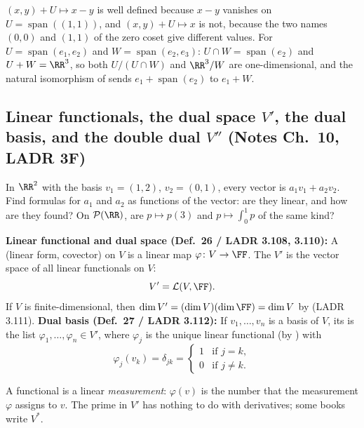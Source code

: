 \documentclass[10pt]{scrartcl}
\DeclareMathOperator{\spn}{span}\DeclareMathOperator{\nul}{null}\DeclareMathOperator{\range}{range}
\newcommand{\PP}{\mathcal P}\newcommand{\LL}{\mathcal L}\newcommand{\MM}{\mathcal M}\newcommand{\T}{\mathsf T}
\begin{document}
\revisit $(x,y)+U\mapsto x-y$ is well defined because $x-y$ vanishes on $U=\spn((1,1))$, and $(x,y)+U\mapsto x$ is not, because the two names $(0,0)$ and $(1,1)$ of the zero coset give different values. For $U=\spn(e_1,e_2)$ and $W=\spn(e_2,e_3)$: $U\cap W=\spn(e_2)$ and $U+W=\RR^3$, so both $U/(U\cap W)$ and $\RR^3/W$ are one-dimensional, and the natural isomorphism of  sends $e_1+\spn(e_2)$ to $e_1+W$.

\subsection{Linear functionals, the dual space $V'$, the dual basis, and the double dual $V''$ (Notes Ch.~10, LADR 3F)}

\begin{qbox}
  In $\RR^2$ with the basis $v_1=(1,2)$, $v_2=(0,1)$, every vector is $a_1v_1+a_2v_2$. Find formulas for $a_1$ and $a_2$ as functions of the vector: are they linear, and how are they found? On $\PP(\RR)$, are $p\mapsto p(3)$ and $p\mapsto\int_0^1p$ of the same kind?
\end{qbox}

\begin{definition*}
  \begin{itemize}
    \ii \textbf{Linear functional and dual space (Def.~26 / LADR 3.108, 3.110):} A  (linear form, covector) on $V$ is a linear map $\varphi\colon V\to\FF$. The  $V'$ is the vector space of all linear functionals on $V$:
    \[
      V' = \LL(V,\FF).
    \]
    If $V$ is finite-dimensional, then $\dim V'=(\dim V)(\dim\FF)=\dim V$ by  (LADR 3.111).
    \ii \textbf{Dual basis (Def.~27 / LADR 3.112):} If $v_1,\dots,v_n$ is a basis of $V$, its  is the list $\varphi_1,\dots,\varphi_n\in V'$, where $\varphi_j$ is the unique linear functional (by ) with
    \[
      \varphi_j(v_k) = \delta_{jk} = \begin{cases} 1 & \text{if } j = k, \\ 0 & \text{if } j \ne k. \end{cases}
    \]
  \end{itemize}
\end{definition*}

A functional is a linear \emph{measurement}: $\varphi(v)$ is the number that the measurement $\varphi$ assigns to $v$. The prime in $V'$ has nothing to do with derivatives; some books write $V^*$.
\end{document}
